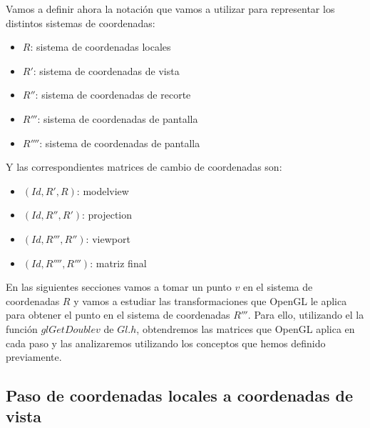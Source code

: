 \documentclass[a4paper,11pt, oneside]{book}
\begin{document}
Vamos a definir ahora la notación que vamos a utilizar para representar los distintos sistemas de coordenadas:

\begin{itemize}
	\item $R$: sistema de coordenadas locales
	\item $R'$: sistema de coordenadas de vista
	\item $R''$: sistema de coordenadas de recorte
	\item $R'''$: sistema de coordenadas de pantalla
	\item $R''''$: sistema de coordenadas de pantalla
\end{itemize}

Y las correspondientes matrices de cambio de coordenadas son:

\begin{itemize}
	\item $(Id, R', R)$: modelview
	\item $(Id, R'', R')$: projection
	\item $(Id, R''', R'')$: viewport
	\item $(Id, R'''', R''')$: matriz final
\end{itemize}

En las siguientes secciones vamos a tomar un punto $v$ en el sistema de coordenadas $R$ y vamos a estudiar las transformaciones que OpenGL le aplica para obtener el punto en el sistema de coordenadas $R'''$. Para ello, utilizando el la función $glGetDoublev$ de $Gl.h$, obtendremos las matrices que OpenGL aplica en cada paso y las analizaremos utilizando los conceptos que hemos definido previamente.



\subsection{Paso de coordenadas locales a coordenadas de vista}
\end{document}
